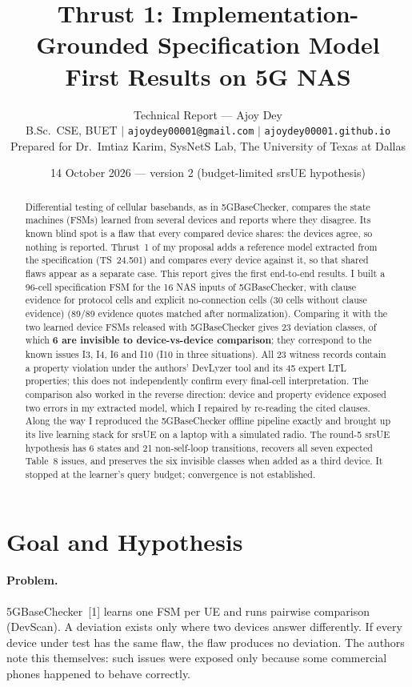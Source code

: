 \documentclass[11pt,a4paper]{article}
\title{\textbf{Thrust 1: Implementation-Grounded Specification Model}\\
\textbf{First Results on 5G NAS}}
\author{%
  Technical Report --- Ajoy Dey\\
  \small B.Sc.\ CSE, BUET \;$|$\; \texttt{ajoydey00001@gmail.com} \;$|$\; \texttt{ajoydey00001.github.io}\\
  \small Prepared for Dr.\ Imtiaz Karim, SysNetS Lab, The University of Texas at Dallas}
\date{\small 14 October 2026 \;---\; version 2 (budget-limited srsUE hypothesis)}
\begin{document}
\maketitle

\begin{abstract}
Differential testing of cellular basebands, as in 5GBaseChecker, compares the state machines (FSMs) learned
from several devices and reports where they disagree. Its known blind spot is a flaw that every compared
device shares: the devices agree, so nothing is reported. Thrust~1 of my proposal adds a reference model
extracted from the specification (TS~24.501) and compares every device against it, so that shared flaws
appear as a separate case. This report gives the first end-to-end results. I built a 96-cell specification
FSM for the 16 NAS inputs of 5GBaseChecker, with clause evidence for protocol cells and explicit no-connection cells
(30 cells without clause evidence) (89/89 evidence quotes matched after normalization). Comparing it with the two learned
device FSMs released with 5GBaseChecker gives 23 deviation classes, of which \textbf{6 are invisible to
device-vs-device comparison}; they correspond to the known issues I3, I4, I6 and I10 (I10 in three
situations). All 23 witness records contain a property violation under the authors' DevLyzer tool and its
45 expert LTL properties; this does not independently confirm every final-cell interpretation. The comparison also worked in the reverse direction: device and property evidence exposed two
errors in my extracted model, which I repaired by re-reading the cited clauses. Along the way I reproduced
the 5GBaseChecker offline pipeline exactly and brought up its live learning stack for srsUE on a laptop with
a simulated radio. The round-5 srsUE hypothesis has 6 states and 21 non-self-loop transitions,
recovers all seven expected Table~8 issues, and preserves the six invisible classes when added as a
third device. It stopped at the learner's query budget; convergence is not established.
\end{abstract}

\tableofcontents
\newpage

\section{Goal and Hypothesis}

\paragraph{Problem.} 5GBaseChecker~[1] learns one FSM per UE and runs pairwise comparison (DevScan). A
deviation exists only where two devices answer differently. If every device under test has the same flaw,
the flaw produces no deviation. The authors note this themselves: such issues were exposed only because
some commercial phones happened to behave correctly.
\end{document}

